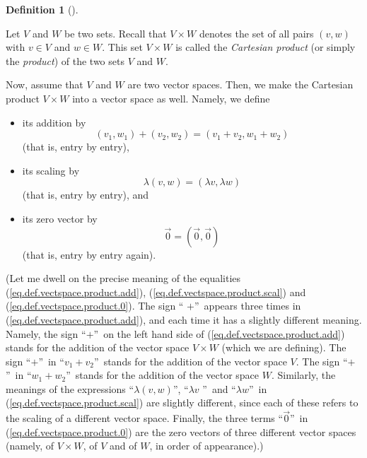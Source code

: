 \documentclass[numbers=enddot,12pt,final,onecolumn,notitlepage]{scrartcl}%
\theoremstyle{definition}
\newtheorem{defi}[theo]{Definition}
\newenvironment{definition}[1][]
{\begin{defi}[#1]\begin{leftbar}}
{\end{leftbar}\end{defi}}
\begin{document}
\begin{definition}
\label{def.vectspace.product}Let $V$ and $W$ be two sets. Recall that $V\times
W$ denotes the set of all pairs $\left(  v,w\right)  $ with $v\in V$ and $w\in
W$. This set $V\times W$ is called the \textit{Cartesian product} (or simply
the \textit{product}) of the two sets $V$ and $W$.

Now, assume that $V$ and $W$ are two vector spaces. Then, we make the
Cartesian product $V\times W$ into a vector space as well. Namely, we define

\begin{itemize}
\item its addition by%
\begin{equation}
\left(  v_{1},w_{1}\right)  +\left(  v_{2},w_{2}\right)  =\left(  v_{1}%
+v_{2},w_{1}+w_{2}\right)  \label{eq.def.vectspace.product.add}%
\end{equation}
(that is, entry by entry),

\item its scaling by%
\begin{equation}
\lambda\left(  v,w\right)  =\left(  \lambda v,\lambda w\right)
\label{eq.def.vectspace.product.scal}%
\end{equation}
(that is, entry by entry), and

\item its zero vector by%
\begin{equation}
\overrightarrow{0}=\left(  \overrightarrow{0},\overrightarrow{0}\right)
\label{eq.def.vectspace.product.0}%
\end{equation}
(that is, entry by entry again).
\end{itemize}

\noindent(Let me dwell on the precise meaning of the equalities
(\ref{eq.def.vectspace.product.add}), (\ref{eq.def.vectspace.product.scal})
and (\ref{eq.def.vectspace.product.0}). The sign \textquotedblleft%
$+$\textquotedblright\ appears three times in
(\ref{eq.def.vectspace.product.add}), and each time it has a slightly
different meaning. Namely, the sign \textquotedblleft$+$\textquotedblright\ on
the left hand side of (\ref{eq.def.vectspace.product.add}) stands for the
addition of the vector space $V\times W$ (which we are defining). The sign
\textquotedblleft$+$\textquotedblright\ in \textquotedblleft$v_{1}+v_{2}%
$\textquotedblright\ stands for the addition of the vector space $V$. The sign
\textquotedblleft$+$\textquotedblright\ in \textquotedblleft$w_{1}+w_{2}%
$\textquotedblright\ stands for the addition of the vector space $W$.
Similarly, the meanings of the expressions \textquotedblleft$\lambda\left(
v,w\right)  $\textquotedblright, \textquotedblleft$\lambda v$%
\textquotedblright\ and \textquotedblleft$\lambda w$\textquotedblright\ in
(\ref{eq.def.vectspace.product.scal}) are slightly different, since each of
these refers to the scaling of a different vector space. Finally, the three
terms \textquotedblleft$\overrightarrow{0}$\textquotedblright\ in
(\ref{eq.def.vectspace.product.0}) are the zero vectors of three different
vector spaces (namely, of $V\times W$, of $V$ and of $W$, in order of appearance).)


\end{definition}
\end{document}
